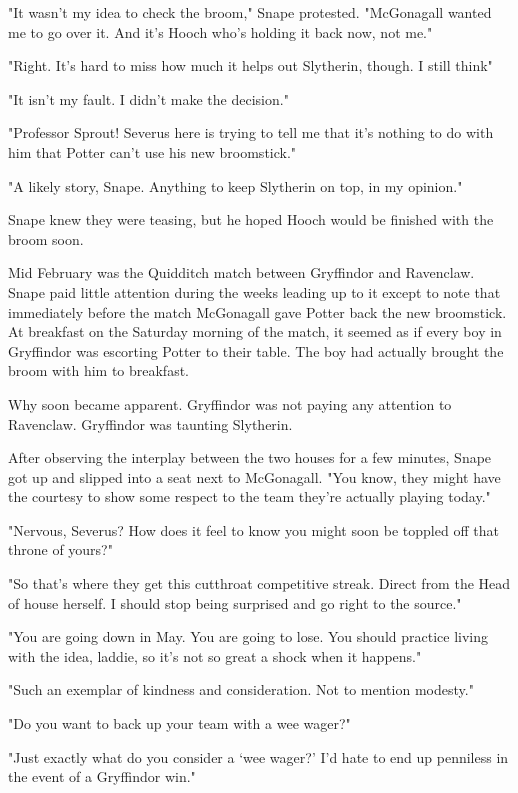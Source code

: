 "It wasn't my idea to check the broom," Snape protested. "McGonagall wanted me to go over it. And it's Hooch who's holding it back now, not me."

"Right. It's hard to miss how much it helps out Slytherin, though. I still think{\el}"

"It isn't my fault. I didn't make the decision."

"Professor Sprout! Severus here is trying to tell me that it's nothing to do with him that Potter can't use his new broomstick."

"A likely story, Snape. Anything to keep Slytherin on top, in my opinion."

Snape knew they were teasing, but he hoped Hooch would be finished with the broom soon.

Mid February was the Quidditch match between Gryffindor and Ravenclaw. Snape paid little attention during the weeks leading up to it except to note that immediately before the match McGonagall gave Potter back the new broomstick. At breakfast on the Saturday morning of the match, it seemed as if every boy in Gryffindor was escorting Potter to their table. The boy had actually brought the broom with him to breakfast.

Why soon became apparent. Gryffindor was not paying any attention to Ravenclaw. Gryffindor was taunting Slytherin.

After observing the interplay between the two houses for a few minutes, Snape got up and slipped into a seat next to McGonagall. "You know, they might have the courtesy to show some respect to the team they're actually playing today."

"Nervous, Severus? How does it feel to know you might soon be toppled off that throne of yours?"

"So that's where they get this cutthroat competitive streak. Direct from the Head of house herself. I should stop being surprised and go right to the source."

"You are going down in May. You are going to lose. You should practice living with the idea, laddie, so it's not so great a shock when it happens."

"Such an exemplar of kindness and consideration. Not to mention modesty."

"Do you want to back up your team with a wee wager?"

"Just exactly what do you consider a `wee wager?' I'd hate to end up penniless in the event of a Gryffindor win."

